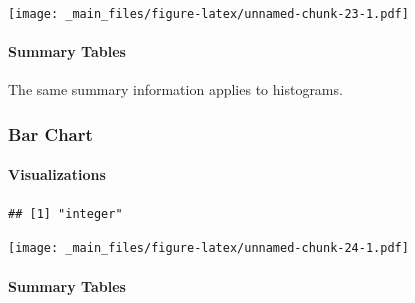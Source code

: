 \documentclass[
]{book}
\newenvironment{Shaded}{\begin{snugshade}}{\end{snugshade}}
\newcommand{\FunctionTok}[1]{\textcolor[rgb]{0.13,0.29,0.53}{\textbf{#1}}}
\newcommand{\NormalTok}[1]{#1}
\newcommand{\SpecialCharTok}[1]{\textcolor[rgb]{0.81,0.36,0.00}{\textbf{#1}}}
\begin{document}
\begin{Shaded}
\end{Shaded}

\texttt{[image: \_main\_files/figure-latex/unnamed-chunk-23-1.pdf]}

\hypertarget{summary-tables-1}{%
\paragraph{Summary Tables}\label{summary-tables-1}}

The same summary information applies to histograms.

\hypertarget{bar-chart}{%
\subsubsection{Bar Chart}\label{bar-chart}}

\hypertarget{visualizations-2}{%
\paragraph{Visualizations}\label{visualizations-2}}

\begin{Shaded}
\end{Shaded}

\begin{verbatim}
## [1] "integer"
\end{verbatim}

\begin{Shaded}
\end{Shaded}

\texttt{[image: \_main\_files/figure-latex/unnamed-chunk-24-1.pdf]}

\hypertarget{summary-tables-2}{%
\paragraph{Summary Tables}\label{summary-tables-2}}
\end{document}
